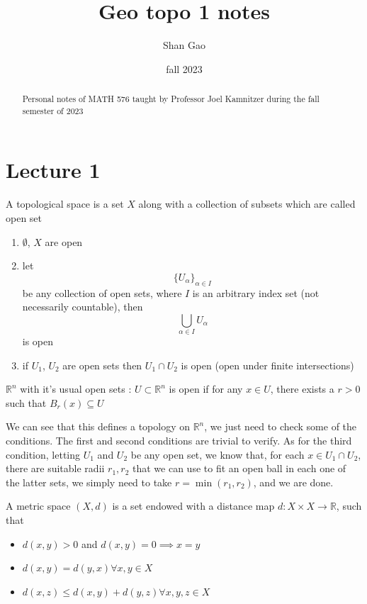 \documentclass[12pt]{article}
\author{Shan Gao}
\title{Geo topo 1 notes}
\date{fall 2023}
\begin{document}
\maketitle
\begin{abstract}
	Personal notes of MATH 576 taught by Professor Joel Kamnitzer during the fall semester of 2023 
\end{abstract}
\section{Lecture 1}
\begin{definition}\label{def:ts}
    A topological space is a set $X$ along with a collection of subsets which are called open set
    \begin{enumerate}
        \item $\emptyset$, $X$ are open 
        \item let 
            $$
            \{U_\alpha\}_{\alpha \in I}
            $$ be any collection of open sets, where $I$ is an arbitrary index set (not necessarily countable), then
            $$
            \bigcup_{\alpha \in I} U_\alpha
            $$ is open
        \item if $U_1$, $U_2$ are open sets then $U_1 \cap U_2$ is open (open under finite intersections)
    \end{enumerate}
\end{definition}
\begin{examples}
    $\mathbb{R}^n$ with it's usual open sets : $U \subset \mathbb{R}^n$ is open if for any $x \in U$, there exists a $r > 0$ such that $B_r(x) \subseteq U$
\end{examples}
\begin{lemma}\label{lem:rntopo}
    We can see that this defines a topology on $\mathbb{R}^n$, we just need to check some of the conditions. The first and second conditions are trivial to verify. As for the third condition, letting $U_1$ and $U_2$ be any open set, we know that, for each $x \in U_1 \cap U_2$, there are suitable radii $r_1, r_2$ that we can use to fit an open ball in each one of the latter sets, we simply need to take $r = \min(r_1,r_2)$, and we are done.
\end{lemma}
\begin{definition}
    A metric space $(X,d)$ is a set endowed with a distance map $d \colon X \times X \to \mathbb{R}$, such that         \begin{itemize}
        \item $d(x,y) > 0$ and $d(x,y) = 0 \implies x = y$
        \item $d(x,y) = d(y,x) \forall x,y \in X$
        \item $d(x,z) \leq d(x,y) + d(y,z) \forall x,y,z \in X$
    \end{itemize} 
\end{definition}
\end{document}
